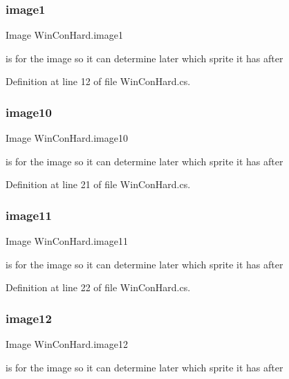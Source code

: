 \subsubsection{\texorpdfstring{image1}{image1}}
{\footnotesize\ttfamily Image Win\+Con\+Hard.\+image1}

is for the image so it can determine later which sprite it has after 

Definition at line 12 of file Win\+Con\+Hard.\+cs.

\mbox{\label{class_win_con_hard_ad9ef6fd00820d93acec38f569b13bb6e}} 
\subsubsection{\texorpdfstring{image10}{image10}}
{\footnotesize\ttfamily Image Win\+Con\+Hard.\+image10}

is for the image so it can determine later which sprite it has after 

Definition at line 21 of file Win\+Con\+Hard.\+cs.

\mbox{\label{class_win_con_hard_a5914f771136789051a77129b79767d65}} 
\subsubsection{\texorpdfstring{image11}{image11}}
{\footnotesize\ttfamily Image Win\+Con\+Hard.\+image11}

is for the image so it can determine later which sprite it has after 

Definition at line 22 of file Win\+Con\+Hard.\+cs.

\mbox{\label{class_win_con_hard_a976a2b5ef28197ac464f8ee23b2816d2}} 
\subsubsection{\texorpdfstring{image12}{image12}}
{\footnotesize\ttfamily Image Win\+Con\+Hard.\+image12}

is for the image so it can determine later which sprite it has after 

